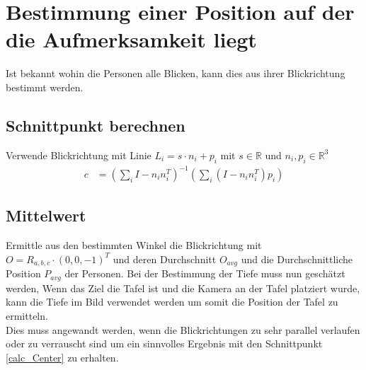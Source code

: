 \section{Bestimmung einer Position auf der die Aufmerksamkeit liegt}
Ist bekannt wohin die Personen alle Blicken, kann dies aus ihrer Blickrichtung bestimmt werden.
\subsection{Schnittpunkt berechnen}
\label{calc_Center}
Verwende Blickrichtung mit Linie $L_i = s \cdot n_i+ p_i$ mit $s\in \mathbb{R}$ und $n_i,p_i \in \mathbb{R}^3$
\begin{align*}
c&=(\sum_{i} I -n_in_i^T)^{-1}
(\sum_{i} (I -n_in_i^T)p_i)
\end{align*}
\subsection{Mittelwert}
Ermittle aus den bestimmten Winkel die Blickrichtung mit $O= R_{a,b,c}\cdot (0,0,-1)^T$ und deren Durchschnitt $O_{avg}$ und die Durchschnittliche Position $P_{avg}$ der Personen. Bei der Bestimmung der Tiefe muss nun geschätzt werden, Wenn das Ziel die Tafel ist und die Kamera an der Tafel platziert wurde, kann die Tiefe im Bild verwendet werden um somit die Position der Tafel zu ermitteln.\\
Dies muss angewandt werden, wenn die Blickrichtungen zu sehr parallel verlaufen oder zu verrauscht sind um ein sinnvolles Ergebnis mit den Schnittpunkt \autoref{calc_Center} zu erhalten.